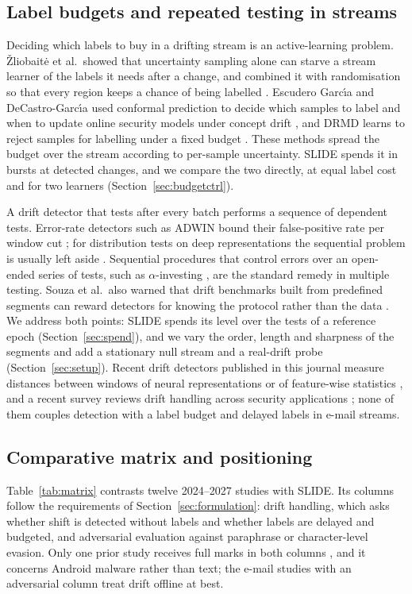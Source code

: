\subsection{Label budgets and repeated testing in streams}
Deciding which labels to buy in a drifting stream is an active-learning problem. \v{Z}liobait\.{e} et al.\ showed that uncertainty sampling alone can starve a stream learner of the labels it needs after a change, and combined it with randomisation so that every region keeps a chance of being labelled \cite{zliobaite2014}. Escudero Garc\'{\i}a and DeCastro-Garc\'{\i}a used conformal prediction to decide which samples to label and when to update online security models under concept drift \cite{escudero2025}, and DRMD learns to reject samples for labelling under a fixed budget \cite{mcfadden2026}. These methods spread the budget over the stream according to per-sample uncertainty. SLIDE spends it in bursts at detected changes, and we compare the two directly, at equal label cost and for two learners (Section~\ref{sec:budgetctrl}).

A drift detector that tests after every batch performs a sequence of dependent tests. Error-rate detectors such as ADWIN bound their false-positive rate per window cut \cite{bifet2007}; for distribution tests on deep representations the sequential problem is usually left aside \cite{rabanser2019,greco2025}. Sequential procedures that control errors over an open-ended series of tests, such as $\alpha$-investing \cite{foster2008}, are the standard remedy in multiple testing. Souza et al.\ also warned that drift benchmarks built from predefined segments can reward detectors for knowing the protocol rather than the data \cite{souza2020}. We address both points: SLIDE spends its level over the tests of a reference epoch (Section~\ref{sec:spend}), and we vary the order, length and sharpness of the segments and add a stationary null stream and a real-drift probe (Section~\ref{sec:setup}). Recent drift detectors published in this journal measure distances between windows of neural representations \cite{shang2025novelty,shang2025radial} or of feature-wise statistics \cite{hinder2024feature}, and a recent survey reviews drift handling across security applications \cite{li2026survey}; none of them couples detection with a label budget and delayed labels in e-mail streams.

\subsection{Comparative matrix and positioning}
Table~\ref{tab:matrix} contrasts twelve 2024--2027 studies with SLIDE. Its columns follow the requirements of Section~\ref{sec:formulation}: drift handling, which asks whether shift is detected without labels and whether labels are delayed and budgeted, and adversarial evaluation against paraphrase or character-level evasion. Only one prior study receives full marks in both columns \cite{sabbah2027}, and it concerns Android malware rather than text; the e-mail studies with an adversarial column treat drift offline at best.

